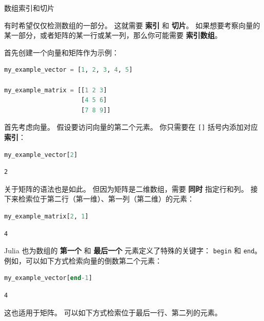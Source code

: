 \documentclass[
  notoc %
]{tufte-book}
\makeatletter
\newcommand{\passthrough}[1]{#1}
\renewcommand\subsubsection{%
\@startsection{subsubsection}{3}{\z@ }{-3.25ex\@plus -1ex \@minus -.2ex}{1.5ex \@plus .2ex}{\normalfont \normalsize \bfseries }
}
\makeatother
\begin{document}
\hypertarget{sec:array_indexing}{%
\subsubsection{数组索引和切片}\label{sec:array_indexing}}

有时希望仅仅检测数组的一部分。 这就需要 \textbf{索引} 和 \textbf{切片}。
如果想要考察向量的某一部分，或者矩阵的某一行或某一列，那么你可能需要
\textbf{索引数组}。

首先创建一个向量和矩阵作为示例：

\begin{lstlisting}[language=Julia]
my_example_vector = [1, 2, 3, 4, 5]

my_example_matrix = [[1 2 3]
                     [4 5 6]
                     [7 8 9]]
\end{lstlisting}

首先考虑向量。 假设要访问向量的第二个元素。 你只需要在
\passthrough{\lstinline![]!} 括号内添加对应\textbf{索引}：

\begin{lstlisting}[language=Julia]
my_example_vector[2]
\end{lstlisting}

\begin{lstlisting}[language=Output]
2
\end{lstlisting}

关于矩阵的语法也是如此。 但因为矩阵是二维数组，需要 \textbf{同时}
指定行和列。 接下来检索位于第二行（第一维）、第一列（第二维）的元素：

\begin{lstlisting}[language=Julia]
my_example_matrix[2, 1]
\end{lstlisting}

\begin{lstlisting}[language=Output]
4
\end{lstlisting}

Julia 也为数组的 \textbf{第一个} 和 \textbf{最后一个}
元素定义了特殊的关键字： \passthrough{\lstinline!begin!} 和
\passthrough{\lstinline!end!}。
例如，可以如下方式检索向量的倒数第二个元素：

\begin{lstlisting}[language=Julia]
my_example_vector[end-1]
\end{lstlisting}

\begin{lstlisting}[language=Output]
4
\end{lstlisting}

这也适用于矩阵。 可以如下方式检索位于最后一行、第二列的元素。
\end{document}
